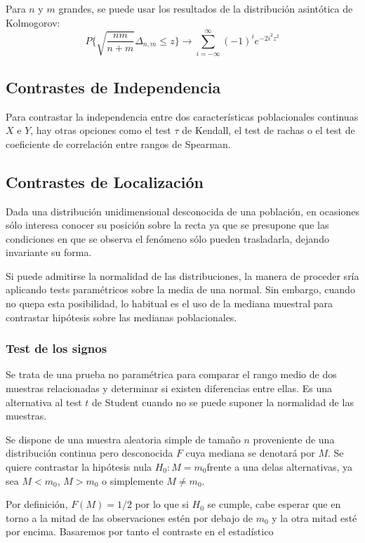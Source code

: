 \documentclass[a4paper,12pt]{article}
\begin{document}
Para $n$ y $m$ grandes, se puede usar los resultados de la distribución asintótica de Kolmogorov:
$$P\{ \sqrt{\frac{nm}{n+m}}\Delta_{n,m}\leq z\}\longrightarrow \sum^{\infty}_{i=-\infty}(-1)^i e^{-2i^2z^2}$$


\subsection{Contrastes de Independencia}
Para contrastar la independencia entre dos características poblacionales continuas $X$ e $Y$, hay otras opciones como el test $\tau$ de Kendall, el test de rachas o el test de coeficiente de correlación entre rangos de Spearman.

\subsection{Contrastes de Localización}
Dada una distribución unidimensional desconocida de una población, en ocasiones sólo interesa conocer su posición sobre la recta ya que se presupone que las condiciones en que se observa el fenómeno sólo pueden trasladarla, dejando invariante su forma.

Si puede admitirse la normalidad de las distribuciones, la manera de proceder sría aplicando tests paramétricos sobre la media de una normal. Sin embargo, cuando no quepa esta posibilidad, lo habitual es el uso de la mediana muestral para contrastar hipótesis sobre las medianas poblacionales.

\subsubsection{Test de los signos}
Se trata de una prueba no paramétrica para comparar el rango medio de dos muestras relacionadas y determinar si existen diferencias entre ellas. Es una alternativa al test $t$ de Student cuando no se puede suponer la normalidad de las muestras.

Se dispone de una muestra aleatoria simple de tamaño $n$ proveniente de una distribución continua pero desconocida $F$ cuya mediana se denotará por $M$. Se quiere contrastar la hipótesis nula $H_0: M=m_0$frente a una delas alternativas, ya sea $M<m_0$, $M>m_0$ o simplemente $M\neq m_0$.

Por definición, $F(M)=1/2$ por lo que si $H_0$ se cumple, cabe esperar que en torno a la mitad de las observaciones estén por debajo de $m_0$ y la otra mitad esté por encima. Basaremos por tanto el contraste en el estadístico
\end{document}
